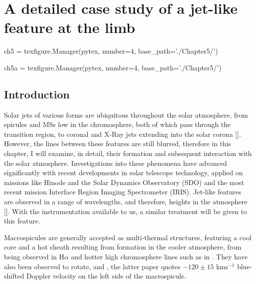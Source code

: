 


\chapter{A detailed case study of a jet-like feature at the limb}
\label{ch:5}
\begin{pycode}[chapter5]
ch5 = texfigure.Manager(pytex, number=4, base_path='./Chapter5/')
\end{pycode}
\begin{pycode}[chapter5a]
ch5a = texfigure.Manager(pytex, number=4, base_path='./Chapter5/')
\end{pycode}


\section{Introduction}
Solar jets of various forms are ubiquitous throughout the solar atmosphere, from spicules and MSs low in the chromosphere, both of which pass through the transition region, to coronal and X-Ray jets extending into the solar corona [\cite{Archontis2008,Majarska2011,Morton2012}].
However, the lines between these features are still blurred, therefore in this chapter, I will examine, in detail, their formation and subsequent interaction with the solar atmosphere.
Investigations into these phenomena have advanced significantly with recent developments in solar telescope technology, applied on missions like Hinode and the Solar Dynamics Observatory (SDO) and the most recent mission Interface Region Imaging Spectrometer (IRIS).
Jet-like features are observed in a range of wavelengths, and therefore, heights in the atmosphere [\cite{Wang1998,Yamaucho2004}].
With the instrumentation available to us, a similar treatment will be given to this feature. 

Macrospicules are generally accepted as multi-thermal structures, featuring a cool core and a hot sheath resulting from formation in the cooler atmosphere, from being observed in H$\alpha$ \citep{LaBonte79} and hotter high chromosphere lines such as in \cite{Parenti2002}.
They have also been observed to rotate, \cite{Pike_Mason1998} and \cite{Kamio2010}, the latter paper quotes $-120 \pm 15$ kms$^{-1}$ blue-shifted Doppler velocity on the left side of the macrospicule. 

